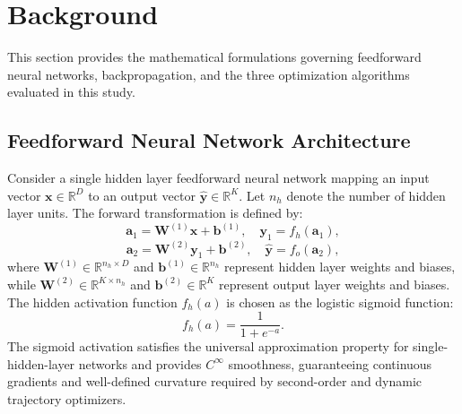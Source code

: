 \documentclass[10pt, conference]{IEEEtran}
\begin{document}
\section{Background}

This section provides the mathematical formulations governing feedforward neural networks, backpropagation, and the three optimization algorithms evaluated in this study.

\subsection{Feedforward Neural Network Architecture}

Consider a single hidden layer feedforward neural network mapping an input vector $\mathbf{x} \in \mathbb{R}^D$ to an output vector $\mathbf{\hat{y}} \in \mathbb{R}^K$. Let $n_h$ denote the number of hidden layer units. The forward transformation is defined by:
\begin{equation}
\mathbf{a}_1 = \mathbf{W}^{(1)} \mathbf{x} + \mathbf{b}^{(1)}, \quad \mathbf{y}_1 = f_h(\mathbf{a}_1),
\end{equation}
\begin{equation}
\mathbf{a}_2 = \mathbf{W}^{(2)} \mathbf{y}_1 + \mathbf{b}^{(2)}, \quad \mathbf{\hat{y}} = f_o(\mathbf{a}_2),
\end{equation}
where $\mathbf{W}^{(1)} \in \mathbb{R}^{n_h \times D}$ and $\mathbf{b}^{(1)} \in \mathbb{R}^{n_h}$ represent hidden layer weights and biases, while $\mathbf{W}^{(2)} \in \mathbb{R}^{K \times n_h}$ and $\mathbf{b}^{(2)} \in \mathbb{R}^K$ represent output layer weights and biases. The hidden activation function $f_h(a)$ is chosen as the logistic sigmoid function:
\begin{equation}
f_h(a) = \frac{1}{1 + e^{-a}}.
\end{equation}
The sigmoid activation satisfies the universal approximation property for single-hidden-layer networks \cite{cybenko1989approximation} and provides $C^\infty$ smoothness, guaranteeing continuous gradients and well-defined curvature required by second-order and dynamic trajectory optimizers.
\end{document}
